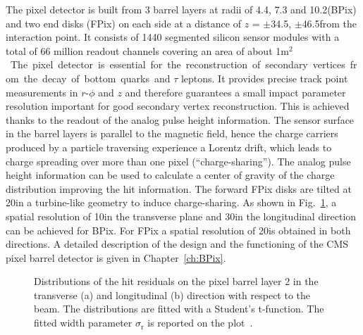 The pixel detector is built from 3 barrel layers at radii of 4.4, 7.3 and 10.2\cm (BPix) and two end disks (FPix) on each side at a distance of $z$ = $\pm$34.5, $\pm$46.5\cm from the interaction point. It consists of 1440 segmented silicon sensor modules with a total of 66 million readout channels covering an area of about 1\unit{m$^2$}. The pixel detector is essential for the reconstruction of secondary vertices from the decay of bottom quarks and $\tau$ leptons. It provides precise track point measurements in $r$-$\phi$ and $z$ and therefore guarantees a small impact parameter resolution important for good secondary vertex reconstruction. This is achieved thanks to the readout of the analog pulse height information. The sensor surface in the barrel layers is parallel to the magnetic field, hence the charge carriers produced by a particle traversing experience a Lorentz drift, which leads to charge spreading over more than one pixel (``charge-sharing''). The analog pulse height information can be used to calculate a center of gravity of the charge distribution improving the hit information. The forward FPix disks are tilted at 20\de in a turbine-like geometry to induce charge-sharing. As shown in Fig.~\ref{fig:pxRes}, a spatial resolution of 10\mum in the transverse plane and 30\mum in the longitudinal direction can be achieved for BPix. For FPix a spatial resolution of 20\mum is obtained in both directions. %
A detailed description of the design and the functioning of the CMS pixel barrel detector is given in Chapter~\ref{ch:BPix}.\\

\begin{figure}[h]
 \begin{center}
 \end{center}
 \caption{Distributions of the hit residuals on the pixel barrel layer 2 in the transverse (a) and longitudinal (b) direction with respect to the beam. The distributions are fitted with a Student's t-function. The fitted width parameter $\sigma_\mathrm{r}$ is reported on the plot~\cite{PixelOffline}.}
 \label{fig:pxRes}
\end{figure}

